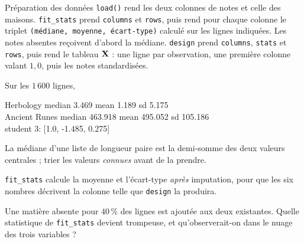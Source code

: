 \begin{tache}{Préparation des données}
 \texttt{load()} rend les deux colonnes de notes et celle des
maisons. \texttt{fit\_stats} prend \texttt{columns} et \texttt{rows}, puis rend
pour chaque colonne le triplet \texttt{(médiane, moyenne, écart-type)} calculé
sur les lignes indiquées. Les notes absentes reçoivent d'abord la médiane.
\texttt{design} prend \texttt{columns}, \texttt{stats} et \texttt{rows}, puis
rend le tableau $\mathbf{X}$ : une ligne par observation, une première colonne valant
$1{,}0$, puis les notes standardisées.

 Sur les $1\,600$ lignes,
\begin{center}\ttfamily\footnotesize
Herbology median 3.469 mean 1.189 sd 5.175\\
Ancient Runes median 463.918 mean 495.052 sd 105.186\\
student 3: [1.0, -1.485, 0.275]
\end{center}

 La médiane d'une liste de longueur paire est la demi-somme des
deux valeurs centrales ; trier les valeurs \emph{connues} avant de la prendre.

 \texttt{fit\_stats} calcule la moyenne et l'écart-type
\emph{après} imputation, pour que les six nombres décrivent la colonne telle que
\texttt{design} la produira.

 Une matière absente pour $40\,\%$ des lignes est ajoutée aux
deux existantes. Quelle statistique de \texttt{fit\_stats} devient trompeuse, et
qu'observerait-on dans le nuage des trois variables ?
\end{tache}

